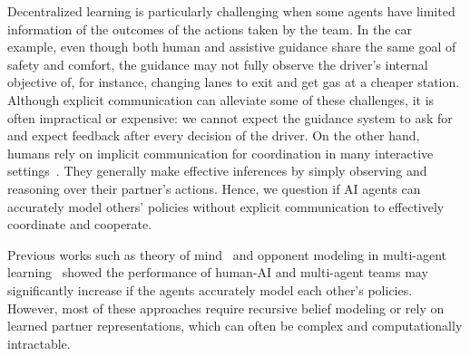 \documentclass[letterpaper]{article} %
\theoremstyle{definition}
\begin{document}

Decentralized learning is particularly challenging when some agents have limited information of the outcomes of the actions taken by the team.
In the car example, even though both human and assistive guidance share the same goal of safety and comfort, the guidance may not fully observe the driver's internal objective of, for instance, changing lanes to exit and get gas at a cheaper station.
Although explicit communication can alleviate some of these challenges, it is often impractical or expensive: we cannot expect the guidance system to ask for and expect feedback after every decision of the driver. On the other hand, humans rely on implicit communication for coordination in many interactive settings~\cite{breazeal2005effects,che2020efficient,losey2020learning}. They generally make effective inferences by simply observing and reasoning over their partner's actions. Hence, we question if AI agents can accurately model others' policies without explicit communication to effectively coordinate and cooperate.


Previous works such as theory of mind~\cite{simon1995information,baker2017rational,brooks2019building,lee2019theoryofmind} and opponent modeling in multi-agent learning~\cite{foerster2018learning,shih2021critical,xie2020learning}
showed the performance of human-AI and multi-agent teams may significantly increase if the agents accurately model each other's policies.
However, most of these approaches require recursive belief modeling or rely on learned partner representations, which can often be complex and computationally intractable.
\end{document}
